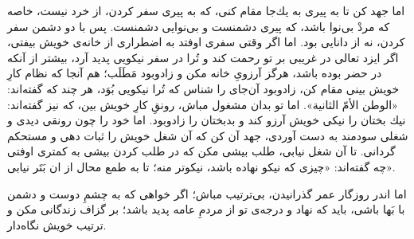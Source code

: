 اما جهد كن تا به پيرى به يك‌جا مقام كنى، كه به پيرى سفر كردن، از خرد نيست، خاصه كه مردْ بى‌نوا باشد، كه پيرى دشمنست و بى‌نوايى دشمنست. پس با دو دشمن سفر كردن، نه از دانايى بود. اما اگر وقتى سفرى اوفتد به اضطرارى از خانه‌ی خويش بيفتى، اگر ايزد تعالى در غريبى بر تو رحمت كند و تُرا در سفر نيكويى پديد آرد، بيشتر از آنكه در حضر بوده باشد، هرگز آرزویِ خانه مكن و زادوبود مَطَلَب؛ هم آنجا كه نظام كارِ خويش بينى مقام كن، زادوبود آن‌جاى را شناس كه تُرا نيكويى بُوَد، هر چند كه گفته‌اند: «الوطن الأمّ الثانية». اما تو بدان مشغول مباش، رونقِ كارِ خويش بين، كه نيز گفته‌اند: نيك بختان را نيكى خويش آرزو كند و بدبختان را زادوبود. اما خود را چون رونقى ديدى و شغلى سودمند به دست آوردى، جهد آن كن كه آن شغل خويش را ثبات دهى و مستحكم گردانى. تا آن شغل نيابى، طلب بيشى مكن كه در طلب كردن بيشى به كمترى اوفتى چه گفته‌اند: «چيزى كه نيكو نهاده باشد، نيكوتر منه؛ تا به طمع محال از ان بَتَر نيابى».

اما اندر روزگار عمر گذرانيدن، بى‌ترتيب مباش؛ اگر خواهى كه به چشمِ دوست و دشمن با بَها باشى، بايد كه نهاد و درجه‌ی تو از مردمِ عامه پديد باشد؛ بر گزاف زندگانى مكن و ترتيب خويش نگاه‌دار.



\newpage





